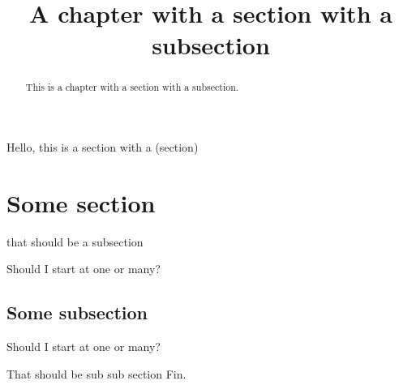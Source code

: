 \documentclass{ximera}
\title{A chapter with a section with a subsection}
\begin{document}
\begin{abstract}
  This is a chapter with a section with a subsection.
\end{abstract}
\maketitle




Hello, this is a section with a (section)

\section{Some section}

that should be a subsection


\begin{theorem}
  Should I start at one or many?
\end{theorem}

\subsection{Some subsection}

\begin{theorem}
  Should I start at one or many?
\end{theorem}


That should be sub sub section
Fin.
\end{document}
